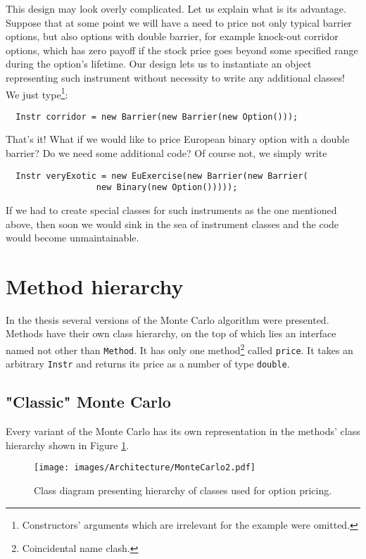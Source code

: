 \documentclass[a4paper,11pt, twoside]{book}
\theoremstyle{definition}
\theoremstyle{remark}
\begin{document}
This design may look overly complicated. Let us explain what is its advantage. Suppose that at some point we will have a need to price not only typical barrier options, but also options with double barrier, for example knock-out corridor options, which has zero payoff if the stock price goes beyond some specified range during the option's lifetime. Our design lets us to instantiate an object representing such instrument without necessity to write any additional classes! We just type\footnote{Constructors' arguments which are irrelevant for the example were omitted.}:
\begin{lstlisting}
  Instr corridor = new Barrier(new Barrier(new Option()));
\end{lstlisting}
That's it! What if we would like to price European binary option with a double barrier? Do we need some additional code? Of course not, we simply write
\begin{lstlisting}
  Instr veryExotic = new EuExercise(new Barrier(new Barrier(
				  new Binary(new Option()))));
\end{lstlisting}
If we had to create special classes for such instruments as the one mentioned above, then soon we would sink in the sea of instrument classes and the code would become unmaintainable.
	
\section{Method hierarchy}
In the thesis several versions of the Monte Carlo algorithm were presented. Methods have their own class hierarchy, on the top of which lies an interface named not other than \texttt{Method}. It has only one method\footnote{Coincidental name clash.} called \texttt{price}. It takes an arbitrary \texttt{Instr} and returns its price as a number of type \texttt{double}.

\subsection{"Classic" Monte Carlo}
Every variant of the Monte Carlo has its own representation in the methods' class hierarchy shown in Figure \ref{fig:arch:MonteCarlo}.
\begin{figure}
\centering
 \texttt{[image: images/Architecture/MonteCarlo2.pdf]}
\caption{Class diagram presenting hierarchy of classes used for option pricing.}
\label{fig:arch:MonteCarlo}
\end{figure}
\end{document}

